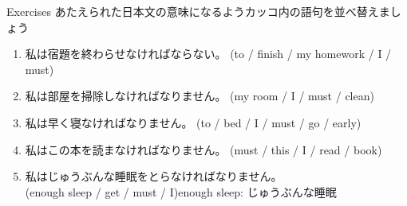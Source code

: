 \documentclass[aspectratio=169,xcolor={dvipsnames,table}]{beamer}
\newcommand{\myaudio}[1]{\href{#1}{\faVolumeUp}}
\begin{document}
\begin{frame}[plain]{Exercises}
あたえられた日本文の意味になるようカッコ内の語句を並べ替えましょう\hfill{\myaudio{./audio/013_must_02.mp3}}
\begin{enumerate}
 \item 私は宿題を終わらせなければならない。
(to / finish / my homework / I / must)\\
 \item 私は部屋を掃除しなければなりません。
(my room / I / must / clean)\\
 \item 私は早く寝なければなりません。
(to / bed / I / must / go / early)\\
 \item 私はこの本を読まなければなりません。
(must / this / I / read / book)\\
 \item 私はじゅうぶんな睡眠をとらなければなりません。\\
(enough sleep / get / must / I)\hfill{\footnotesize enough sleep: じゅうぶんな睡眠}\\
\end{enumerate}
\end{frame}
\end{document}
